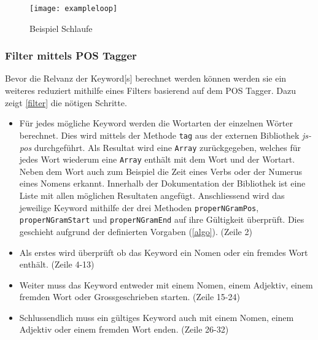 
\begin{figure}[H]
\centering
\texttt{[image: exampleloop]}
\caption{Beispiel Schlaufe}
\label{fig:exampleloop}
\end{figure}



\subsubsection{Filter mittels POS Tagger}
Bevor die Relvanz der \gls{Keyword}[s] berechnet werden können werden sie ein weiteres reduziert mithilfe eines Filters basierend auf dem POS Tagger. Dazu zeigt \autoref{filter} die nötigen Schritte.
\begin{itemize}
    \item Für jedes mögliche \gls{Keyword} werden die Wortarten der einzelnen Wörter berechnet. Dies wird mittels der Methode \texttt{tag} aus der externen Bibliothek \textit{js-pos} durchgeführt. Als Resultat wird eine \texttt{Array} zurückgegeben, welches für jedes Wort wiederum eine \texttt{Array} enthält mit dem Wort und der Wortart. Neben dem Wort auch zum Beispiel die Zeit eines Verbs oder der Numerus eines Nomens erkannt. Innerhalb der Dokumentation der Bibliothek ist eine Liste mit allen möglichen Resultaten angefügt. Anschliessend wird das jeweilige \gls{Keyword} mithilfe der drei Methoden \texttt{properNGramPos}, \texttt{properNGramStart} und \texttt{properNGramEnd} auf ihre Gültigkeit überprüft. Dies geschieht aufgrund der definierten Vorgaben (\autoref{algo}). \cite{GitHubda36:online} (Zeile 2) 
    \item Als erstes wird überprüft ob das \gls{Keyword} ein Nomen oder ein fremdes Wort enthält. (Zeile 4-13)
    \item Weiter muss das \gls{Keyword} entweder mit einem Nomen, einem Adjektiv, einem fremden Wort oder Grossgeschrieben starten. (Zeile 15-24)
    \item Schlussendlich muss ein gültiges \gls{Keyword} auch mit einem Nomen, einem Adjektiv oder einem fremden Wort enden. (Zeile 26-32)
\end{itemize}

